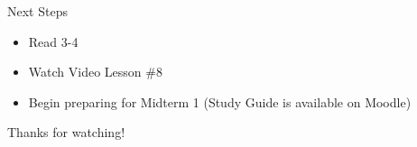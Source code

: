 \documentclass[t, aspectratio=169]{beamer}
\newcommand{\?}{\stackrel{?}{=}}
\begin{document}
	\begin{frame}{Next Steps}
		\begin{itemize}
			\item Read 3-4
			\item Watch Video Lesson \#8
			\item Begin preparing for Midterm 1 (Study Guide is available on Moodle)
		\end{itemize}
	
		\vfill
		
		Thanks for watching!
	\end{frame}
	
\end{document}
